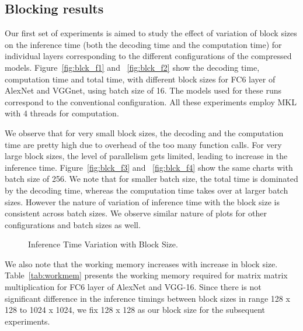 \subsection{Blocking results}

Our first set of experiments is aimed to study the effect of variation of  block sizes on the inference time (both the decoding time and  
the computation time) for individual layers corresponding to the different configurations of the  compressed models. 
 Figure~\ref{fig:blck_f1} and ~\ref{fig:blck_f2}
show the decoding time, computation time and total time, with different block sizes for FC6 layer of AlexNet and VGGnet,
using batch size of 16. The models used for these runs  correspond to the conventional configuration. All these experiments employ MKL with 4 threads
for computation.



We observe that for very small block sizes,  the decoding and the computation time are pretty high due to overhead of the too many function calls.
For very large block sizes, the level of parallelism gets limited, leading to increase in the inference time.
Figure~\ref{fig:blck_f3} and ~\ref{fig:blck_f4} show the same charts with batch size of 256. We note that for smaller batch size, the total time is dominated by the decoding time, 
whereas the computation time takes over at larger batch sizes. However the nature of variation of  inference time with the block size is consistent across batch sizes.
We observe similar nature of plots for other configurations and batch sizes as well.



\begin{figure*}[!tbp]
  \centering
  \hspace{1mm}
  \hspace{1mm}
  \hspace{1mm}
  \caption{Inference Time Variation with Block Size.}
\end{figure*}




We also note that the working memory increases with increase in block size. 
Table~\ref{tab:workmem} presents the working memory required for matrix matrix multiplication for FC6 layer of AlexNet and VGG-16.
Since there is not significant difference in the inference timings between block sizes in range 128 x 128 to 1024 x 1024, we fix 128 x 128 as our block size
for the subsequent experiments.



